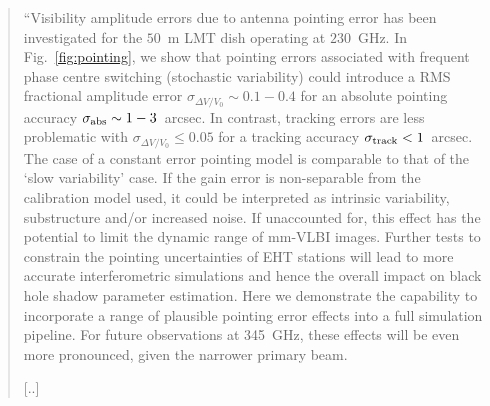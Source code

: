 \begin{quotation}
``Visibility amplitude errors due to antenna pointing error has been investigated for the $50$~m  LMT dish operating at $230$~GHz. In Fig.~\ref{fig:pointing}, we show that pointing errors associated with frequent phase centre switching (stochastic variability) could introduce a RMS fractional amplitude error $\sigma_{\Delta V/V_0} \sim 0.1 - 0.4$ for an absolute pointing accuracy  $\sigma_{\rm abs} \sim 1-3$~arcsec. In contrast, tracking errors are less problematic with $\sigma_{\Delta V/V_0} \le 0.05$ for a tracking accuracy  $\sigma_{\rm track}<1$~arcsec. The case of a constant error pointing model is comparable to that of the `slow variability' case. If the gain error is non-separable from the calibration model used, it could be interpreted as intrinsic variability, substructure and/or increased noise. If unaccounted for, this effect has the potential to limit the dynamic range of mm-VLBI images. Further tests to constrain the pointing uncertainties of EHT stations will lead to more accurate interferometric simulations and hence the overall impact on black hole shadow parameter estimation. Here we demonstrate the capability to incorporate a range of plausible pointing error effects into a full simulation pipeline. For future observations at 345~GHz, these effects will be even more pronounced, given the narrower primary beam.

[..]
\\
\citep{Blecher_2016}
\end{quotation}







